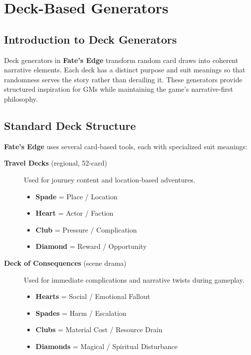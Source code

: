 
\chapter{Deck-Based Generators}\label{chap:deck_generators}

\section{Introduction to Deck Generators}\label{sec:deck_intro}

Deck generators in \textbf{Fate's Edge} transform random card draws into coherent narrative elements. Each deck has a distinct purpose and suit meanings so that randomness serves the story rather than derailing it. These generators provide structured inspiration for GMs while maintaining the game's narrative‑first philosophy.

\section{Standard Deck Structure}\label{sec:deck_structure}

\textbf{Fate's Edge} uses several card‑based tools, each with specialized suit meanings:

\begin{description}
    \item[\textbf{Travel Decks} (regional, 52‑card)] 
        Used for journey content and location‑based adventures.
        \begin{itemize}
            \item \textbf{Spade} = Place / Location
            \item \textbf{Heart} = Actor / Faction
            \item \textbf{Club} = Pressure / Complication
            \item \textbf{Diamond} = Reward / Opportunity
        \end{itemize}
    \item[\textbf{Deck of Consequences} (scene drama)] 
        Used for immediate complications and narrative twists during gameplay.
        \begin{itemize}
            \item \textbf{Hearts} = Social / Emotional Fallout
            \item \textbf{Spades} = Harm / Escalation
            \item \textbf{Clubs} = Material Cost / Resource Drain
            \item \textbf{Diamonds} = Magical / Spiritual Disturbance
        \end{itemize}
\end{description}

